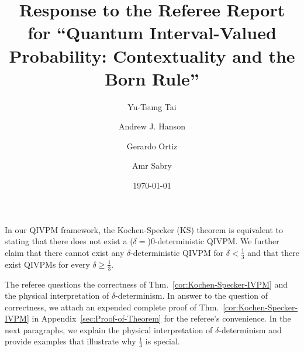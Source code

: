 \documentclass[english,reprint, aps, prl,superscriptaddress, showpacs,
showkeys, longbibliography, amsmath, amssymb, floatfix]{revtex4-1}
\theoremstyle{plain}
\theoremstyle{definition}
\begin{document}
\title{Response to the Referee Report for ``Quantum Interval-Valued Probability:
Contextuality and the Born Rule''}

\author{Yu-Tsung Tai}



\author{Andrew J. Hanson}


\author{Gerardo Ortiz}


\author{Amr Sabry}


\date{\today}

\maketitle

In our QIVPM framework, the Kochen-Specker (KS) theorem is equivalent
to stating that there does not exist a ($\delta=$)$0$-deterministic
QIVPM. We further claim that there cannot exist any $\delta$-deterministic
QIVPM for $\delta<\frac{1}{3}$ and that there exist QIVPMs for every
$\delta\ge\frac{1}{3}$.

The referee questions the correctness of Thm.~\ref{cor:Kochen-Specker-IVPM}
and the physical interpretation of $\delta$-determinism. In answer
to the question of correctness, we attach an expended complete proof
of Thm.~\ref{cor:Kochen-Specker-IVPM} in Appendix~\ref{sec:Proof-of-Theorem}
for the referee's convenience. In the next paragraphs, we explain
the physical interpretation of $\delta$-determinism and provide examples
that illustrate why $\frac{1}{3}$ is special.
\end{document}

